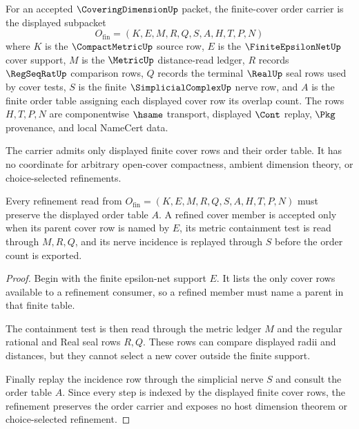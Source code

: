 \begin{definition}
\label{def:coveringdimension-finite-cover-order-carrier}
For an accepted $\CoveringDimensionUp$ packet, the finite-cover order carrier is the displayed subpacket
$$
O_{\mathrm{fin}}=(K,E,M,R,Q,S,A,H,T,P,N)
$$
where $K$ is the $\CompactMetricUp$ source row, $E$ is the $\FiniteEpsilonNetUp$ cover support, $M$ is the $\MetricUp$ distance-read ledger, $R$ records $\RegSeqRatUp$ comparison rows, $Q$ records the terminal $\RealUp$ seal rows used by cover tests, $S$ is the finite $\SimplicialComplexUp$ nerve row, and $A$ is the finite order table assigning each displayed cover row its overlap count. The rows $H,T,P,N$ are componentwise $\hsame$ transport, displayed $\Cont$ replay, $\Pkg$ provenance, and local NameCert data.

The carrier admits only displayed finite cover rows and their order table. It has no coordinate for arbitrary open-cover compactness, ambient dimension theory, or choice-selected refinements.
\end{definition}

\begin{theorem}
\label{thm:coveringdimension-finite-cover-order-refinement}
Every refinement read from $O_{\mathrm{fin}}=(K,E,M,R,Q,S,A,H,T,P,N)$ must preserve the displayed order table $A$. A refined cover member is accepted only when its parent cover row is named by $E$, its metric containment test is read through $M,R,Q$, and its nerve incidence is replayed through $S$ before the order count is exported.
\end{theorem}
\begin{proof}
Begin with the finite epsilon-net support $E$. It lists the only cover rows available to a refinement consumer, so a refined member must name a parent in that finite table.

The containment test is then read through the metric ledger $M$ and the regular rational and Real seal rows $R,Q$. These rows can compare displayed radii and distances, but they cannot select a new cover outside the finite support.

Finally replay the incidence row through the simplicial nerve $S$ and consult the order table $A$. Since every step is indexed by the displayed finite cover rows, the refinement preserves the order carrier and exposes no host dimension theorem or choice-selected refinement.
\end{proof}

